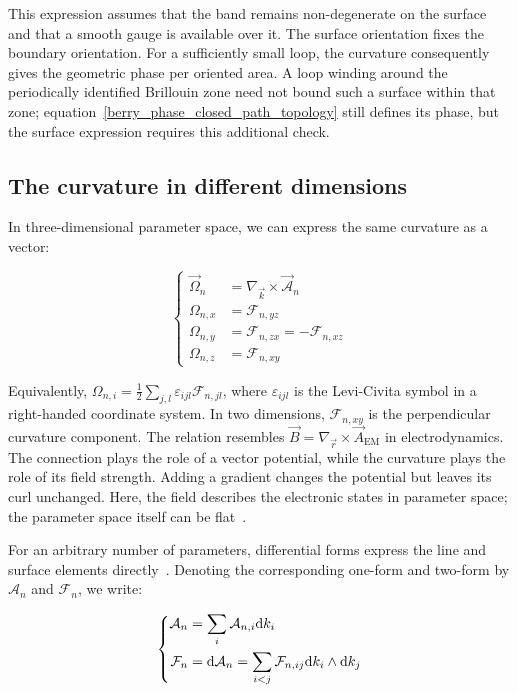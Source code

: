 This expression assumes that the band remains non-degenerate on the surface and that a smooth gauge is available over it.
The surface orientation fixes the boundary orientation.
For a sufficiently small loop, the curvature consequently gives the geometric phase per oriented area.
A loop winding around the periodically identified Brillouin zone need not bound such a surface within that zone;
equation~\eqref{berry_phase_closed_path_topology} still defines its phase, but the surface expression requires this additional check.

\subsection{The curvature in different dimensions}

In three-dimensional parameter space, we can express the same curvature as a vector:

\begin{equation}
\left\{\begin{aligned}
    \vec{\Omega}_n&=\nabla_{\vec{k}}\times\vec{\mathcal{A}}_n \\
    \Omega_{n,x}&=\mathcal{F}_{n,yz} \\
    \Omega_{n,y}&=\mathcal{F}_{n,zx}=-\mathcal{F}_{n,xz} \\
    \Omega_{n,z}&=\mathcal{F}_{n,xy}
\end{aligned}\right.
\label{berry_curvature_vector_appendix}
\end{equation}

Equivalently, $\Omega_{n,i}=\frac{1}{2}\sum_{j,l}\varepsilon_{ijl}\mathcal{F}_{n,jl}$,
where $\varepsilon_{ijl}$ is the Levi-Civita symbol in a right-handed coordinate system.
In two dimensions, $\mathcal{F}_{n,xy}$ is the perpendicular curvature component.
The relation resembles $\vec{B}=\nabla_{\vec{r}}\times\vec{A}_\mathrm{EM}$ in electrodynamics.
The connection plays the role of a vector potential, while the curvature plays the role of its field strength.
Adding a gradient changes the potential but leaves its curl unchanged.
Here, the field describes the electronic states in parameter space; the parameter space itself can be flat~\cite{xiao2010berry}.

For an arbitrary number of parameters, differential forms express the line and surface elements directly~\cite{hassani2013mathematical,nakahara2018geometry}.
Denoting the corresponding one-form and two-form by $\mathcal{A}_n$ and $\mathcal{F}_n$, we write:

\begin{equation}
\left\{\begin{aligned}
    \mathcal{A}_n&=\sum_i\mathcal{A}_{n,i}\mathrm{d} k_i \\
    \mathcal{F}_n&=\mathrm{d}\mathcal{A}_n
    =\sum_{i<j}\mathcal{F}_{n,ij}\mathrm{d} k_i\wedge\mathrm{d} k_j
\end{aligned}\right.
\label{berry_differential_forms_appendix}
\end{equation}

